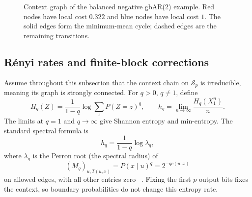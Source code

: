 \documentclass[11pt,a4paper]{article}
\begin{document}
\begin{figure}[tbp]
\centering
{}
\caption{Context graph of the balanced negative gbAR(2) example.  Red
nodes have local cost $0.322$ and blue nodes have local cost $1$.  The
solid edges form the minimum-mean cycle; dashed edges are the remaining
transitions.}
\label{fig:gbar2_context_graph}
\end{figure}

\subsection{R\'enyi rates and finite-block corrections}
\label{subsec:renyi_finite}

Assume throughout this subsection that the context chain on
$\mathcal S_p$ is irreducible, meaning its graph is strongly connected.  For $q>0$, $q\ne1$, define
\[
    H_q(Z)=\frac{1}{1-q}\log\sum_zP(Z=z)^q,
    \qquad h_q=\lim_{n\to\infty}\frac{H_q(X_1^n)}n.
\]
The limits at $q=1$ and $q\to\infty$ give Shannon entropy and
min-entropy.  The standard spectral formula is
\begin{equation}
\label{eq:renyi_spectral}
    h_q=\frac{1}{1-q}\log\lambda_q,
\end{equation}
where $\lambda_q$ is the Perron root (the spectral radius) of
\[
    (M_q)_{u,T(u,x)}=P(x\mid u)^q=2^{-q c(u,x)}
\]
on allowed edges, with all other entries zero
~\cite{rached2001renyi}.  Fixing the first $p$ output bits fixes the
context, so boundary probabilities do not change this entropy rate.
\end{document}
